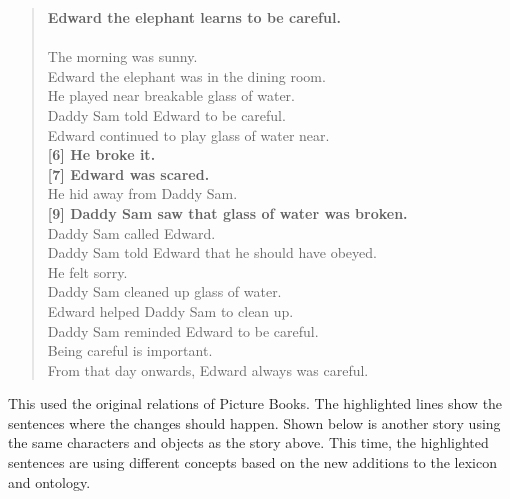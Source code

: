 \begin{verse}
\textbf{Edward the elephant learns to be careful.}\\
~\\
[1]  The morning was sunny.\\
[2]  Edward the elephant was in the dining room.\\
[3]  He played near breakable glass of water.\\
[4]  Daddy Sam told Edward to be careful.\\
[5]  Edward continued to play glass of water near.\\
\textbf{[6]  He broke it.}\\
\textbf{[7]  Edward was scared.}\\
[8]  He hid away from Daddy Sam.\\
\textbf{[9]  Daddy Sam saw that glass of water was broken.}\\
[10] Daddy Sam called Edward.\\
[11] Daddy Sam told Edward that he should have obeyed.\\
[12] He felt sorry.\\
[13] Daddy Sam cleaned up glass of water.\\
[14] Edward helped Daddy Sam to clean up.\\
[15] Daddy Sam reminded Edward to be careful.\\
[16] Being careful is important.\\
[17] From that day onwards, Edward always was careful.
\end{verse}

This used the original relations of Picture Books. The highlighted lines show the sentences where the changes should happen. Shown below is another story using the same characters and objects as the story above. This time, the highlighted sentences are using different concepts based on the new additions to the lexicon and ontology.

